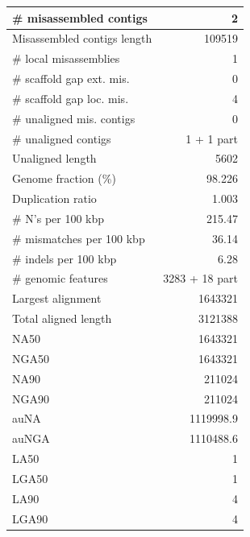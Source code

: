\documentclass[12pt,a4paper]{article}
\begin{document}
\begin{table}[ht]
\begin{center}
\begin{tabular}{|l*{1}{|r}|}
\# misassembled contigs & 2 \\ \hline
Misassembled contigs length & 109519 \\ \hline
\# local misassemblies & 1 \\ \hline
\# scaffold gap ext. mis. & 0 \\ \hline
\# scaffold gap loc. mis. & 4 \\ \hline
\# unaligned mis. contigs & 0 \\ \hline
\# unaligned contigs & 1 + 1 part \\ \hline
Unaligned length & 5602 \\ \hline
Genome fraction (\%) & 98.226 \\ \hline
Duplication ratio & 1.003 \\ \hline
\# N's per 100 kbp & 215.47 \\ \hline
\# mismatches per 100 kbp & 36.14 \\ \hline
\# indels per 100 kbp & 6.28 \\ \hline
\# genomic features & 3283 + 18 part \\ \hline
Largest alignment & 1643321 \\ \hline
Total aligned length & 3121388 \\ \hline
NA50 & 1643321 \\ \hline
NGA50 & 1643321 \\ \hline
NA90 & 211024 \\ \hline
NGA90 & 211024 \\ \hline
auNA & 1119998.9 \\ \hline
auNGA & 1110488.6 \\ \hline
LA50 & 1 \\ \hline
LGA50 & 1 \\ \hline
LA90 & 4 \\ \hline
LGA90 & 4 \\ \hline
\end{tabular}
\end{center}
\end{table}
\end{document}

